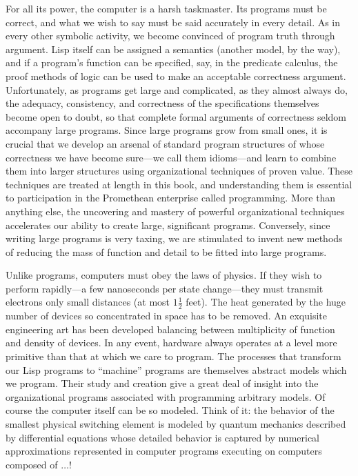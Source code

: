 For all its power, the computer is a harsh taskmaster.  Its programs must be
correct, and what we wish to say must be said accurately in every detail.  As
in every other symbolic activity, we become convinced of program truth through
argument.  Lisp itself can be assigned a semantics (another model, by the way),
and if a program's function can be specified, say, in the predicate calculus,
the proof methods of logic can be used to make an acceptable correctness
argument.  Unfortunately, as programs get large and complicated, as they almost
always do, the adequacy, consistency, and correctness of the specifications
themselves become open to doubt, so that complete formal arguments of
correctness seldom accompany large programs.  Since large programs grow from
small ones, it is crucial that we develop an arsenal of standard program
structures of whose correctness we have become sure---we call them idioms---and
learn to combine them into larger structures using organizational techniques of
proven value.  These techniques are treated at length in this book, and
understanding them is essential to participation in the Promethean enterprise
called programming.  More than anything else, the uncovering and mastery of
powerful organizational techniques accelerates our ability to create large,
significant programs.  Conversely, since writing large programs is very taxing,
we are stimulated to invent new methods of reducing the mass of function and
detail to be fitted into large programs.

Unlike programs, computers must obey the laws of physics.  If they wish to
perform rapidly---a few nanoseconds per state change---they must transmit
electrons only small distances (at most \( 1 \frac{1}{2} \) feet). The heat generated by
the huge number of devices so concentrated in space has to be removed.  An
exquisite engineering art has been developed balancing between multiplicity of
function and density of devices.  In any event, hardware always operates at a
level more primitive than that at which we care to program.  The processes that
transform our Lisp programs to ``machine'' programs are themselves abstract
models which we program.  Their study and creation give a great deal of insight
into the organizational programs associated with programming arbitrary models.
Of course the computer itself can be so modeled.  Think of it: the behavior of
the smallest physical switching element is modeled by quantum mechanics
described by differential equations whose detailed behavior is captured by
numerical approximations represented in computer programs executing on
computers composed of \( \dots \)!

